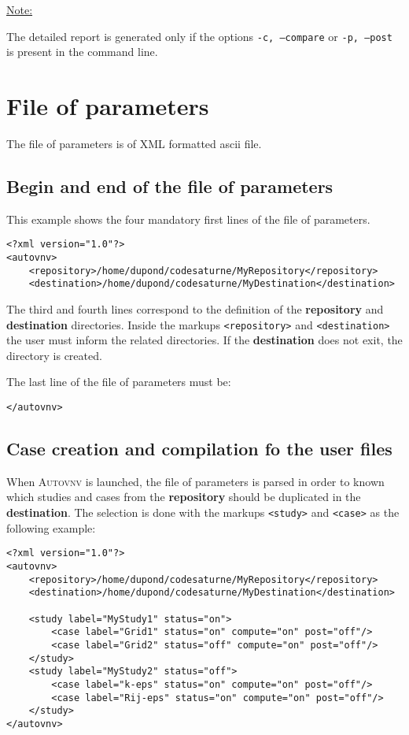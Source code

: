 \documentclass[a4paper,10pt,twoside]{article}
\begin{document}
\underline{Note:}

The detailed report is generated only if the options \texttt{-c, --compare}
or \texttt{-p, --post} is present in the command line.

\section{File of parameters}

The file of parameters is of XML formatted ascii file.

\subsection{Begin and end of the file of parameters}

This example shows the four mandatory first lines of the file of parameters.

\begin{verbatim}
<?xml version="1.0"?>
<autovnv>
    <repository>/home/dupond/codesaturne/MyRepository</repository>
    <destination>/home/dupond/codesaturne/MyDestination</destination>
\end{verbatim}


The third and fourth lines correspond to the definition of the \textbf{repository}
and \textbf{destination} directories.
Inside the markups \texttt{<repository>} and \texttt{<destination>} the user
must inform the related directories. If the \textbf{destination} does not exit,
the directory is created.

The last line of the file of parameters must be:

\begin{verbatim}
</autovnv>
\end{verbatim}

\subsection{Case creation and compilation fo the user files}

When \textsc{Autovnv} is launched, the file of parameters is parsed in order to known
which studies and cases from the \textbf{repository} should be duplicated in
the \textbf{destination}. The selection is done with the markups \texttt{<study>}
and \texttt{<case>} as the following example:

\begin{verbatim}
<?xml version="1.0"?>
<autovnv>
    <repository>/home/dupond/codesaturne/MyRepository</repository>
    <destination>/home/dupond/codesaturne/MyDestination</destination>

    <study label="MyStudy1" status="on">
        <case label="Grid1" status="on" compute="on" post="off"/>
        <case label="Grid2" status="off" compute="on" post="off"/>
    </study>
    <study label="MyStudy2" status="off">
        <case label="k-eps" status="on" compute="on" post="off"/>
        <case label="Rij-eps" status="on" compute="on" post="off"/>
    </study>
</autovnv>
\end{verbatim}
\end{document}
